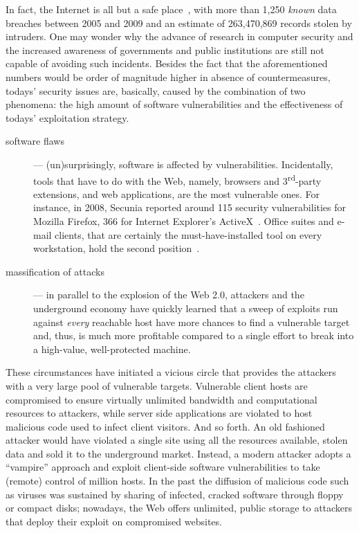 In fact, the Internet is all but a safe place~\citep{whid}, with more than 1,250 \emph{known} data breaches between 2005 and 2009 \citep{data-breaches-chronology} and an estimate of 263,470,869 records stolen by intruders. One may wonder why the advance of research in computer security and the increased awareness of governments and public institutions are still not capable of avoiding such incidents. Besides the fact that the aforementioned numbers would be order of magnitude higher in absence of countermeasures, todays' security issues are, basically, caused by the combination of two phenomena: the high amount of software vulnerabilities and the effectiveness of todays' exploitation strategy.

\begin{description}
\item[software flaws] --- (un)surprisingly, software is affected by   vulnerabilities. Incidentally, tools that have to do with the Web,   namely, browsers and 3\textsuperscript{rd}-party extensions, and web   applications, are the most vulnerable ones. For instance, in 2008,   \textsf{Secunia} reported around 115 security vulnerabilities for   \textsf{Mozilla Firefox}, 366 for \textsf{Internet Explorer}'s   \textsf{ActiveX}~\citep{secunia2008}. Office suites and e-mail   clients, that are certainly the must-have-installed tool   on every workstation, hold the second position~\citep{sans20}.
  
\item[massification of attacks] --- in parallel to the explosion of   the Web 2.0, attackers and the underground economy have quickly   learned that a sweep of exploits run against \emph{every} reachable   host have more chances to find a vulnerable target and, thus, is   much more profitable compared to a single effort to break into a   high-value, well-protected machine.
\end{description}

These circumstances have initiated a vicious circle that provides the attackers with a very large pool of vulnerable targets. Vulnerable client hosts are compromised to ensure virtually unlimited bandwidth and computational resources to attackers, while server side applications are violated to host malicious code used to infect client visitors. And so forth. An old fashioned attacker would have violated a single site using all the resources available, stolen data and sold it to the underground market. Instead, a modern attacker adopts a ``vampire'' approach and exploit client-side software vulnerabilities to take (remote) control of million hosts. In the past the diffusion of malicious code such as viruses was sustained by sharing of infected, cracked software through floppy or compact disks; nowadays, the Web offers unlimited, public storage to attackers that deploy their exploit on compromised websites.

